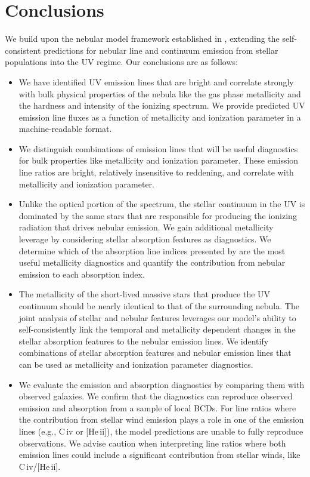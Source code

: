 \documentclass[preprint2]{aastex61}
\newcommand{\heii}{[He\,{\sc ii}]\xspace}
\newcommand{\civ}{C\,{\sc iv}\xspace}
\begin{document}
\section{Conclusions} \label{sec:conclusions}
We build upon the nebular model framework established in \citet{Byler+2016}, extending the self-consistent predictions for nebular line and continuum emission from stellar populations into the UV regime. Our conclusions are as follows:

\begin{itemize}
    \item We have identified UV emission lines that are bright and correlate strongly with bulk physical properties of the nebula like the gas phase metallicity and the hardness and intensity of the ionizing spectrum. We provide predicted UV emission line fluxes as a function of metallicity and ionization parameter in a machine-readable format.
    \item We distinguish combinations of emission lines that will be useful diagnostics for bulk properties like metallicity and ionization parameter. These emission line ratios are bright, relatively insensitive to reddening, and correlate with metallicity and ionization parameter.
    \item Unlike the optical portion of the spectrum, the stellar continuum in the UV is dominated by the same stars that are responsible for producing the ionizing radiation that drives nebular emission. We gain additional metallicity leverage by considering stellar absorption features as diagnostics. We determine which of the absorption line indices presented by \citet{Leitherer+2011} are the most useful metallicity diagnostics and quantify the contribution from nebular emission to each absorption index.
    \item The metallicity of the short-lived massive stars that produce the UV continuum should be nearly identical to that of the surrounding nebula. The joint analysis of stellar and nebular features leverages our model's ability to self-consistently link the temporal and metallicity dependent changes in the stellar absorption features to the nebular emission lines. We identify combinations of stellar absorption features and nebular emission lines that can be used as metallicity and ionization parameter diagnostics.
    \item We evaluate the emission and absorption diagnostics by comparing them with observed galaxies. We confirm that the diagnostics can reproduce observed emission and absorption from a sample of local BCDs. For line ratios where the contribution from stellar wind emission plays a role in one of the emission lines (e.g., \civ or \heii), the model predictions are unable to fully reproduce observations. We advise caution when interpreting line ratios where both emission lines could include a significant contribution from stellar winds, like \civ/\heii. 

\end{itemize}
\end{document}
